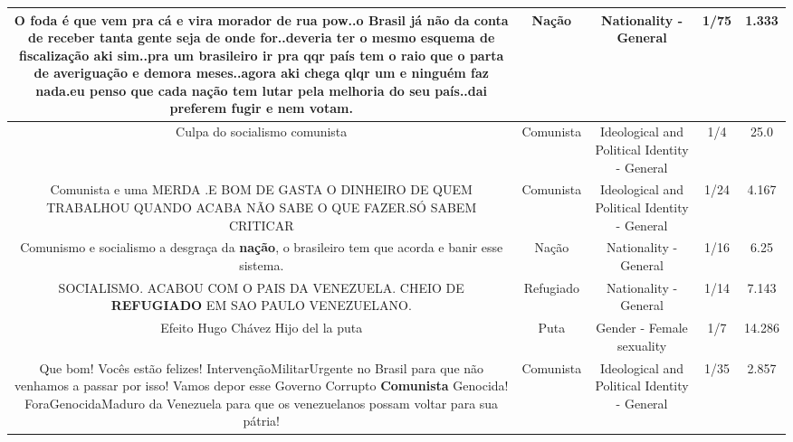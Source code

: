 \documentclass[11pt]{article}
\newlength\mylength
\begin{document}
\begin{center}
\begin{longtable}{|C{.65\mylength}|C{.30\mylength}|C{.12\mylength}|C{.12\mylength}|C{.12\mylength}|}
  \small O foda é que vem pra cá e vira morador de rua pow..o Brasil já não da conta de receber tanta gente seja de onde for..deveria ter o mesmo esquema de fiscalização aki sim..pra um brasileiro ir pra qqr país tem o raio que o parta de averiguação e demora meses..agora aki chega qlqr um e ninguém faz nada.eu penso que cada \textbf{nação} tem lutar pela melhoria do seu país..dai preferem fugir e nem votam.\normalsize   & Nação & Nationality - General & 1/75 & 1.333 \\  \hline
  \small Culpa do socialismo comunista\normalsize   & Comunista & Ideological and Political Identity - General & 1/4 & 25.0 \\  \hline
  \small Comunista e uma MERDA .E BOM DE GASTA O DINHEIRO DE QUEM TRABALHOU QUANDO ACABA NÃO SABE O QUE FAZER.SÓ SABEM CRITICAR\normalsize   & Comunista & Ideological and Political Identity - General & 1/24 & 4.167 \\  \hline
  \small Comunismo e socialismo a desgraça da \textbf{nação}, o brasileiro tem que acorda e banir esse sistema.\normalsize   & Nação & Nationality - General & 1/16 & 6.25 \\  \hline
  \small SOCIALISMO. ACABOU COM O PAIS DA VENEZUELA.   CHEIO DE \textbf{REFUGIADO} EM SAO PAULO VENEZUELANO.\normalsize   & Refugiado & Nationality - General & 1/14 & 7.143 \\  \hline
  \small Efeito Hugo Chávez Hijo del la puta\normalsize   & Puta & Gender - Female sexuality & 1/7 & 14.286 \\  \hline
  \small Que bom! Vocês estão felizes! IntervençãoMilitarUrgente no Brasil para que não venhamos a passar por isso! Vamos depor esse Governo Corrupto \textbf{Comunista} Genocida! ForaGenocidaMaduro da Venezuela para que os venezuelanos possam voltar para sua pátria!\normalsize   & Comunista & Ideological and Political Identity - General & 1/35 & 2.857 \\  \hline

\end{longtable}
\end{center}
\end{document}
